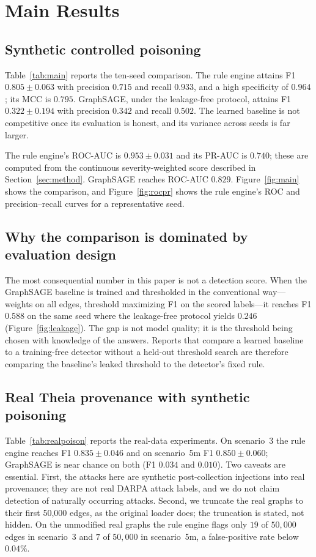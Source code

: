 \documentclass[conference]{IEEEtran}
\begin{document}
\section{Main Results}
\label{sec:results}
\subsection{Synthetic controlled poisoning}
Table~\ref{tab:main} reports the ten-seed comparison. The rule engine attains F1
$0.805\pm0.063$ with precision $0.715$ and recall $0.933$, and a high specificity
of $0.964$; its MCC is $0.795$. GraphSAGE, under the leakage-free protocol,
attains F1 $0.322\pm0.194$ with precision $0.342$ and recall $0.502$. The learned
baseline is not competitive once its evaluation is honest, and its variance
across seeds is far larger.

The rule engine's ROC-AUC is $0.953\pm0.031$ and its PR-AUC is $0.740$; these are
computed from the continuous severity-weighted score described in
Section~\ref{sec:method}. GraphSAGE reaches ROC-AUC $0.829$. Figure~\ref{fig:main}
shows the comparison, and Figure~\ref{fig:rocpr} shows the rule engine's ROC and
precision--recall curves for a representative seed.

\subsection{Why the comparison is dominated by evaluation design}
The most consequential number in this paper is not a detection score. When the
GraphSAGE baseline is trained and thresholded in the conventional way---weights
on all edges, threshold maximizing F1 on the scored labels---it reaches F1
$0.588$ on the same seed where the leakage-free protocol yields $0.246$
(Figure~\ref{fig:leakage}). The gap is not model quality; it is the threshold
being chosen with knowledge of the answers. Reports that compare a learned
baseline to a training-free detector without a held-out threshold search are
therefore comparing the baseline's leaked threshold to the detector's fixed
rule.

\subsection{Real Theia provenance with synthetic poisoning}
Table~\ref{tab:realpoison} reports the real-data experiments. On scenario~3 the
rule engine reaches F1 $0.835\pm0.046$ and on scenario~5m F1 $0.850\pm0.060$;
GraphSAGE is near chance on both (F1 $0.034$ and $0.010$). Two caveats are
essential. First, the attacks here are synthetic post-collection injections into
real provenance; they are not real DARPA attack labels, and we do not claim
detection of naturally occurring attacks. Second, we truncate the real graphs to
their first 50{,}000 edges, as the original loader does; the truncation is
stated, not hidden. On the unmodified real graphs the rule engine flags only
$19$ of $50{,}000$ edges in scenario~3 and $7$ of $50{,}000$ in scenario~5m, a
false-positive rate below $0.04\%$.
\end{document}
